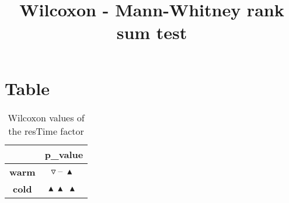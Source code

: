 \documentclass{article}
\title{Wilcoxon - Mann-Whitney rank sum test}
\author{}
\begin{document}
\maketitle
\section{Table}
\begin{table}[!htp]
  \caption{Wilcoxon values of the resTime factor}
  \label{table:resTime}
  \centering
  \begin{scriptsize}
  \begin{tabular}{c|c}
      & \textbf{p\_value} \\\hline
      \textbf{warm} & $\triangledown\ \text{--}\ \blacktriangle\ $ \\
      \textbf{cold} & $\blacktriangle\ \blacktriangle\ \blacktriangle\ $ \\
  \end{tabular}
  \end{scriptsize}
\end{table}
\end{document}
